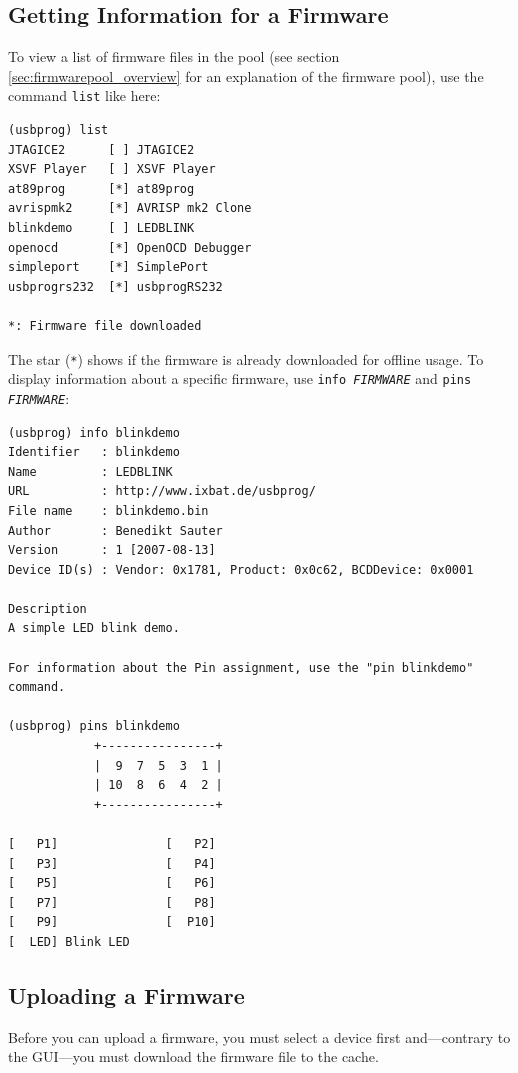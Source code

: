 \documentclass[bibtotoc,UKenglish,halfparskip,oneside,DIV12]{scrreprt}
\begin{document}
\subsection{Getting Information for a Firmware}

To view a list of firmware files in the pool (see section \vref{sec:firmwarepool_overview} for an
explanation of the firmware pool), use the command \texttt{list} like here:

\begin{lstlisting}[style=inline]
(usbprog) list
JTAGICE2      [ ] JTAGICE2
XSVF Player   [ ] XSVF Player
at89prog      [*] at89prog
avrispmk2     [*] AVRISP mk2 Clone
blinkdemo     [ ] LEDBLINK
openocd       [*] OpenOCD Debugger
simpleport    [*] SimplePort
usbprogrs232  [*] usbprogRS232

*: Firmware file downloaded
\end{lstlisting}

The star (\texttt{*}) shows if the firmware is already downloaded for offline usage. To display
information about a specific firmware, use \texttt{info \emph{FIRMWARE}} and \texttt{pins
\emph{FIRMWARE}}:

\begin{lstlisting}[style=inline]
(usbprog) info blinkdemo
Identifier   : blinkdemo
Name         : LEDBLINK
URL          : http://www.ixbat.de/usbprog/
File name    : blinkdemo.bin
Author       : Benedikt Sauter
Version      : 1 [2007-08-13]
Device ID(s) : Vendor: 0x1781, Product: 0x0c62, BCDDevice: 0x0001

Description
A simple LED blink demo.

For information about the Pin assignment, use the "pin blinkdemo" command.

(usbprog) pins blinkdemo
            +----------------+
            |  9  7  5  3  1 |
            | 10  8  6  4  2 |
            +----------------+

[   P1]               [   P2] 
[   P3]               [   P4] 
[   P5]               [   P6] 
[   P7]               [   P8] 
[   P9]               [  P10] 
[  LED] Blink LED     
\end{lstlisting}

\subsection{Uploading a Firmware}

Before you can upload a firmware, you must select a device first and---contrary to the GUI---you
must download the firmware file to the cache.
\end{document}
